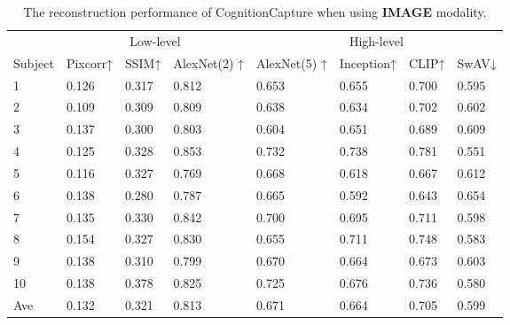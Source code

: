 \documentclass[letterpaper]{article} %
\begin{document}
\begin{table}[ht]
\centering
\begin{tabular}{llllllll}
\hline
 & \multicolumn{3}{c|}{Low-level} & \multicolumn{4}{c}{High-level} \\ \cline{2-8} 
Subject & Pixcorr↑ & SSIM↑ & AlexNet(2) ↑ & AlexNet(5) ↑ & Inception↑ & CLIP↑ & SwAV↓ \\ \hline
1 & 0.126 & 0.317 & 0.812 & 0.653 & 0.655 & 0.700 & 0.595 \\
2 & 0.109 & 0.309 & 0.809 & 0.638 & 0.634 & 0.702 & 0.602 \\
3 & 0.137 & 0.300 & 0.803 & 0.604 & 0.651 & 0.689 & 0.609 \\
4 & 0.125 & 0.328 & 0.853 & 0.732 & 0.738 & 0.781 & 0.551 \\
5 & 0.116 & 0.327 & 0.769 & 0.668 & 0.618 & 0.667 & 0.612 \\
6 & 0.138 & 0.280 & 0.787 & 0.665 & 0.592 & 0.643 & 0.654 \\
7 & 0.135 & 0.330 & 0.842 & 0.700 & 0.695 & 0.711 & 0.598 \\
8 & 0.154 & 0.327 & 0.830 & 0.655 & 0.711 & 0.748 & 0.583 \\
9 & 0.138 & 0.310 & 0.799 & 0.670 & 0.664 & 0.673 & 0.603 \\
10 & 0.138 & 0.378 & 0.825 & 0.725 & 0.676 & 0.736 & 0.580 \\
Ave & 0.132 & 0.321 & 0.813 & 0.671 & 0.664 & 0.705 & 0.599 \\ \hline
\end{tabular}
\caption{The reconstruction performance of CognitionCapture when using \textbf{IMAGE} modality.}
\label{tab:reconimg}
\end{table}
\end{document}
